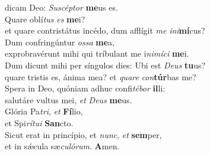 \evenverse dicam Deo: \textit{Su}\textit{scép}\textit{tor} \textbf{me}us es.\\
\oddverse Quare oblí\textit{tus} \textit{es} \textbf{me}i?~\*\\
\oddverse et quare contristátus incédo, dum afflígit \textit{me} \textit{i}\textit{ni}\textbf{mí}cus?\\
\evenverse Dum confringúntur \textit{os}\textit{sa} \textbf{me}a,~\*\\
\evenverse exprobravérunt mihi qui tríbulant me i\textit{ni}\textit{mí}\textit{ci} \textbf{me}i.\\
\oddverse Dum dicunt mihi per síngulos dies: Ubi est \textit{De}\textit{us} \textbf{tu}us?~\*\\
\oddverse quare tristis es, ánima mea? et \textit{qua}\textit{re} \textit{con}\textbf{túr}bas me?\\
\evenverse Spera in Deo, quóniam adhuc confi\textit{té}\textit{bor} \textbf{il}li:~\*\\
\evenverse salutáre vultus mei, \textit{et} \textit{De}\textit{us} \textbf{me}us.\\
\oddverse Glória Pa\textit{tri}, \textit{et} \textbf{Fí}lio,~\*\\
\oddverse et Spi\textit{rí}\textit{tu}\textit{i} \textbf{San}cto.\\
\evenverse Sicut erat in princípio, et \textit{nunc}, \textit{et} \textbf{sem}per,~\*\\
\evenverse et in sǽcula sæ\textit{cu}\textit{ló}\textit{rum}. \textbf{A}men.\\
